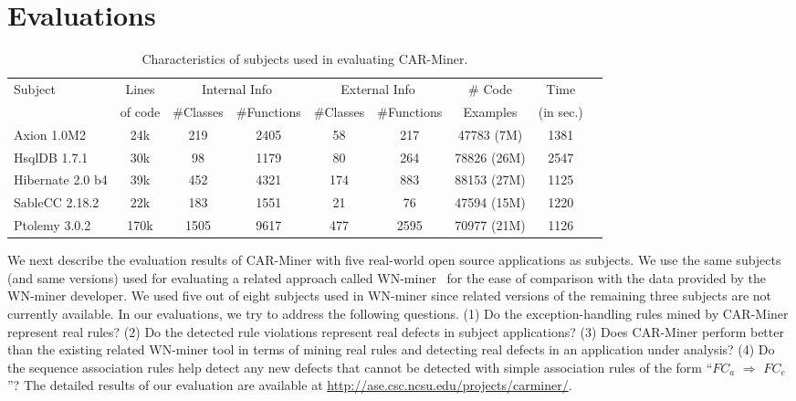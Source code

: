 \section{Evaluations}
\label{sec:eval}

\setlength{\tabcolsep}{1pt}
\begin{table}[t]
\begin{SmallOut}
\begin{CodeOut}
\begin{center}
\centering \caption {\label{tab:subjects} Characteristics of subjects used in evaluating CAR-Miner.}
\begin {tabular} {|l|c|c|c|c|c|c|c|l|}
\hline
Subject&Lines&\multicolumn{2}{|c|}{Internal Info}&\multicolumn{2}{|c|}{External Info}&\# Code&Time\\
\cline{3-6}
&of code&\#Classes&\#Functions&\#Classes&\#Functions&Examples&(in sec.)\\
\hline
\hline Axion 1.0M2&24k&219&2405&58&217&47783 (7M)&1381\\
\hline HsqlDB 1.7.1&30k&98&1179&80&264&78826 (26M)&2547\\
\hline Hibernate 2.0 b4&39k&452&4321&174&883&88153 (27M)&1125\\
\hline SableCC 2.18.2&22k&183&1551&21&76&47594 (15M)&1220\\
\hline Ptolemy 3.0.2&170k&1505&9617&477&2595&70977 (21M)&1126\\
\hline
\end{tabular}
\end{center}
\end{CodeOut}
\end{SmallOut}\vspace*{-6ex}
\end{table}

We next describe the evaluation results of CAR-Miner with five
real-world open source applications as subjects. We use the same 
subjects (and same versions) used for 
evaluating a related approach called WN-miner~\cite{WeimerN05}
for the ease of comparison with the data provided by the WN-miner developer.
We used five out of eight subjects used in WN-miner since related versions of the remaining
three subjects are not currently available.
In our evaluations, we try to address the following questions.
(1) Do the exception-handling rules mined by CAR-Miner represent real rules?
(2) Do the detected rule violations represent real defects in subject applications?
(3) Does CAR-Miner perform better than the existing related WN-miner tool in terms of mining real rules and detecting real defects in an application under analysis? 
(4) Do the sequence association rules help detect any new defects that cannot be detected
with simple association rules of the form ``$FC_a$ $\Rightarrow$ $FC_e$''?
The detailed results of our evaluation are available at \url{http://ase.csc.ncsu.edu/projects/carminer/}.
